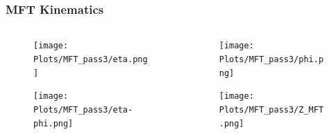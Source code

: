 \documentclass[11pt]{beamer}
\begin{document}
\begin{frame}
    \frametitle{MFT Kinematics}

    \begin{columns}[c]
        \begin{column}{0.5\textwidth}
            \begin{figure}
                \begin{center}
                    \texttt{[image: Plots/MFT\_pass3/eta.png]}
                \end{center}
            \end{figure}
            \begin{figure}
                \begin{center}
                    \texttt{[image: Plots/MFT\_pass3/eta-phi.png]}
                \end{center}
            \end{figure}
        \end{column}
        \begin{column}{0.5\textwidth}
            \begin{figure}
                \begin{center}
                    \texttt{[image: Plots/MFT\_pass3/phi.png]}
                \end{center}
            \end{figure}
            \begin{figure}
                \begin{center}
                    \texttt{[image: Plots/MFT\_pass3/Z\_MFT.png]}
                \end{center}
            \end{figure}
        \end{column}
    \end{columns}

\end{frame}
\end{document}
